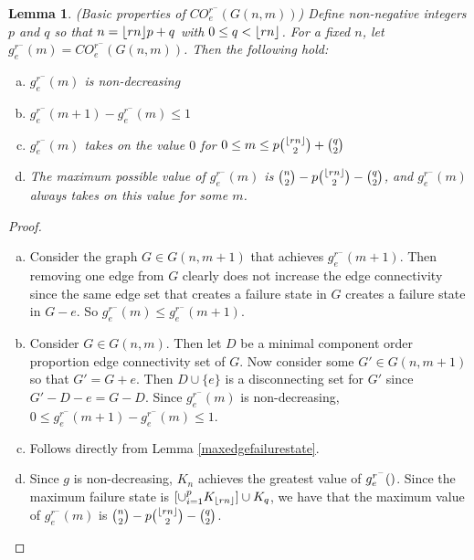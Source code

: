 \documentclass[12pt]{article}
\DeclarePairedDelimiter{\floor}{\lfloor}{\rfloor}
\newtheorem{lemma}[theorem]{Lemma}
\theoremstyle{definition}
\newcommand{\COEMIN}[1]{CO^{r^-}_{e}(#1)}
\newcommand{\geMIN}[1]{g_{e}^{r^-}(#1)}
\begin{document}
\begin{lemma}\label{coeminprop}(Basic properties of $\COEMIN{G(n,m)}$)  Define non-negative integers $p$ and $q$ so that $n=\floor{rn}p+q$ with $0 \leq q < \floor{rn}$.
For a fixed $n$, let $\geMIN{m}=\COEMIN{G(n,m)}$. Then the following hold:
\begin{enumerate}[(a)]
  \item $\geMIN{m}$ is non-decreasing
  \item $\geMIN{m+1}-\geMIN{m} \leq 1$
  \item $\geMIN{m}$ takes on the value $0$ for $0 \le m \le p{\floor{rn} \choose 2} + {q \choose 2}$
  \item The maximum possible value of $\geMIN{m}$ is ${n \choose 2}-p{\floor{rn} \choose 2} - {q \choose 2}$, and $\geMIN{m}$ always takes on this value for some $m$.
\end{enumerate}
\end{lemma}


\begin{proof} 
\hfill
\begin{enumerate}[(a)]
  \item Consider the graph $G \in G(n,m+1)$ that achieves $\geMIN{m+1}$. Then removing one edge from $G$ clearly does not increase the edge connectivity since the same edge set that creates a failure state in $G$ creates a failure state in $G-e$. So $\geMIN{m} \le \geMIN{m+1}$.
  
  \item Consider $G \in G(n,m)$. Then let $D$ be a minimal component order proportion edge connectivity set of $G$. Now consider some $G' \in G(n,m+1)$ so that $G'=G+e$. Then $D\cup\{e\}$ is a disconnecting set for $G'$ since $G'-D-e=G-D$. Since $\geMIN{m}$ is non-decreasing, $0 \le \geMIN{m+1}-\geMIN{m}\le 1$.
  
  \item Follows directly from Lemma \ref{maxedgefailurestate}.
  \item Since $g$ is non-decreasing, $K_{n}$ achieves the greatest value of $\geMIN$. Since the maximum failure state is $\displaystyle [\cup^{p}_{i=1}K_{\floor{rn}} ] \cup K_{q}$, we have that the maximum value of $\geMIN{m}$ is ${n \choose 2}-p{\floor{rn} \choose 2} - {q \choose 2}$.
\end{enumerate}
\end{proof}
\end{document}
